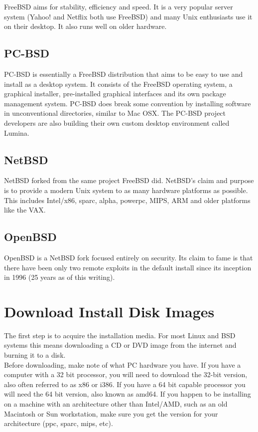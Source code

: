 FreeBSD aims for stability, efficiency and speed.  It is a very popular server system (Yahoo! and Netflix both use FreeBSD) and many Unix enthusiasts use it on their desktop.  It also runs well on older hardware.

\subsection{PC-BSD}

PC-BSD is essentially a FreeBSD distribution that aims to be easy to use and install as a desktop system.  It consists of the FreeBSD operating system, a graphical installer, pre-installed graphical interfaces and its own package management system.  PC-BSD does break some convention by installing software in unconventional directories, similar to Mac OSX.  The PC-BSD project developers are also building their own custom desktop environment called Lumina.

\subsection{NetBSD}

NetBSD forked from the same project FreeBSD did.  NetBSD's claim and purpose is to provide a modern Unix system to as many hardware platforms as possible.  This includes Intel/x86, sparc, alpha, powerpc, MIPS, ARM and older platforms like the VAX.

\subsection{OpenBSD}

OpenBSD is a NetBSD fork focused entirely on security.  Its claim to fame is that there have been only two remote exploits in the default install since its inception in 1996 (25 years as of this writing).

\section{Download Install Disk Images}

The first step is to acquire the installation media.  For most Linux and BSD systems this means downloading a CD or DVD image from the internet and burning it to a disk.\\

Before downloading, make note of what PC hardware you have.  If you have a computer with a 32 bit processor, you will need to download the 32-bit version, also often referred to as x86 or i386.  If you have a 64 bit capable processor you will need the 64 bit version, also known as amd64.  If you happen to be installing on a machine with an architecture other than Intel/AMD, such as an old Macintosh or Sun workstation, make sure you get the version for your architecture (ppc, sparc, mips, etc).\\

